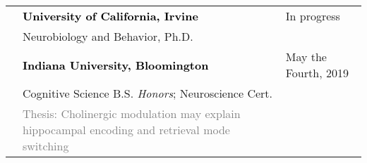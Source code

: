 \documentclass[11pt]{cooperCV_v1/cooperCV} %
\begin{document}



%


\selectfont


\begin{minipage}{\textwidth}







  \begin{tabular}{ p{} 
                   p{} 
                   p{}}
  
  \small\textcolor{gray}{{\emph{  }}} & \textbf{\textcolor{black}{University of California, Irvine}} & {\hfill \small{In progress}}\\
   \small & {Neurobiology and Behavior, Ph.D.} & {\hfill} \newline\\
  \small\textcolor{gray}{{\emph{  }}} & \textbf{\textcolor{black}{Indiana University, Bloomington}} & {\hfill \small{May the Fourth, 2019}}\\\small & {Cognitive Science B.S. \emph{Honors}; Neuroscience Cert.} & {\hfill} \\
   & \small{\textcolor{gray}{Thesis: Cholinergic modulation may explain hippocampal encoding and retrieval mode switching}} & {\hfill} \newline \\
  
\end{tabular}


%


\end{minipage}
\end{document}
